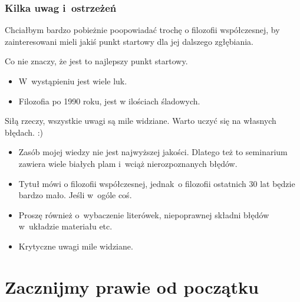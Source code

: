 \documentclass[10pt,t]{beamer}
\begin{document}
\begin{frame}
  \frametitle{Kilka uwag i~ostrzeżeń}


  Chciałbym bardzo pobieżnie poopowiadać trochę o filozofii współczesnej,
  by zainteresowani mieli jakiś punkt startowy dla jej dalszego zgłębiania.

  Co nie znaczy, że jest to najlepszy punkt startowy.
  \begin{itemize}

  \item W~wystąpieniu jest wiele luk.

  \item Filozofia po 1990 roku, jest w ilościach śladowych.

  \end{itemize}

  Siłą rzeczy, wszystkie uwagi są mile widziane. Warto uczyć się na własnych
  błędach. :)

  \begin{itemize}

  \item Zasób mojej wiedzy nie jest najwyższej jakości. Dlatego też to
    seminarium zawiera wiele białych plam i~wciąż nierozpoznanych błędów.

  \item Tytuł mówi o filozofii współczesnej, jednak~o filozofii ostatnich
    30 lat będzie bardzo mało. Jeśli w~ogóle coś.

  \item Proszę również o~wybaczenie literówek, niepoprawnej składni błędów
    w~układzie materiału etc.

  \item Krytyczne uwagi mile widziane.

  \end{itemize}

\end{frame}










\section{Zacznijmy prawie od początku}
\end{document}
